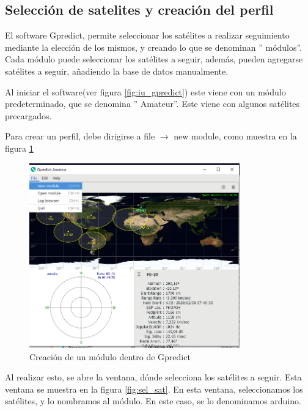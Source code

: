 \subsection{Selección de satelites y creación del perfil} 

El software Gpredict, permite seleccionar los satélites a realizar seguimiento mediante la elección de los mismos, y creando lo que se denominan '' módulos''. Cada módulo puede seleccionar los satélites a seguir, además, pueden agregarse satélites a seguir, añadiendo la base de datos manualmente.

Al iniciar el software(ver figura \ref{fig:iu_gpredict}) este viene con un módulo predeterminado, que se denomina '' Amateur''. Este viene con algunos satélites precargados. 

Para crear un perfil, debe dirigirse a file $\rightarrow$ new module, como muestra en la figura \ref{fig:create_modul_gpred}  
\begin{figure}[ht]
	\centering
	\includegraphics[width=\textwidth,height=8cm]{create_module}
	\caption{Creación de un módulo dentro de Gpredict} 
	\label{fig:create_modul_gpred}	
\end{figure}
Al realizar esto, se abre la ventana, dónde selecciona los satélites a seguir. Esta ventana se muestra en la figura \ref{fig:sel_sat}. En esta ventana, seleccionamos los satélites, y lo nombramos al módulo. En este caso, se lo denominamos arduino. 


